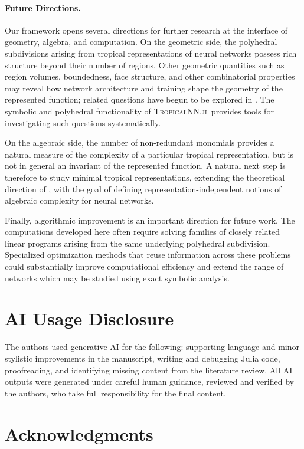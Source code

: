 \documentclass[10pt]{article}
\theoremstyle{definition}
\theoremstyle{remark}
\begin{document}
\paragraph{Future Directions.} Our framework opens several directions for further research at the interface of geometry, algebra, and computation. On the geometric side, the polyhedral subdivisions arising from tropical representations of neural networks possess rich structure beyond their number of regions. Other geometric quantities such as region volumes, boundedness, face structure, and other combinatorial properties may reveal how network architecture and training shape the geometry of the represented function; related questions have begun to be explored in \cite{liu2023relu,gaines2026characterizing}. The symbolic and polyhedral functionality of \textsc{TropicalNN.jl} provides tools for
investigating such questions systematically.

On the algebraic side, the number of non-redundant monomials provides a natural measure of the complexity of a particular tropical representation, but is not in general an invariant of the represented function. A natural next step is therefore to study minimal tropical
representations, extending the theoretical direction of \cite{tran2024minimal}, with the goal of defining representation-independent notions of algebraic complexity for neural networks.

Finally, algorithmic improvement is an important direction for future work. The computations developed here often require solving families of closely related linear programs arising from the same underlying polyhedral subdivision. 
Specialized optimization methods that reuse information across these problems could substantially improve computational efficiency and extend the range of networks which may be studied using exact symbolic analysis.

\section*{AI Usage Disclosure}
The authors used generative AI for the following: supporting language and minor stylistic improvements in the manuscript, writing and debugging Julia code, proofreading, and identifying missing content from the literature review. All AI outputs were generated under careful human guidance, reviewed and verified by the authors, who take full responsibility for the final content.

\section*{Acknowledgments}
\end{document}
